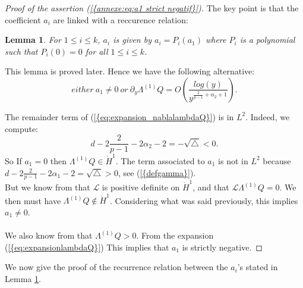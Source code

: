 \documentclass[11pt,a4paper,reqno]{amsart}
\newtheorem{lemma}[theorem]{Lemma}
\theoremstyle{remark}
\numberwithin{equation}{section}
\begin{document}
\begin{appendix}
\begin{proof}[Proof of the assertion {{\rm (\ref{{annexe:eq:a1 strict negatif}})}}]
The key point is that the coefficient $a_i$ are linked with a reccurence relation:

\begin{lemma}\label{lem:relationrecurrencecoefasymptotique}
For $1\leq i \leq k$, $a_i$ is given by $a_i=P_i(a_1)$ where $P_i$ is a polynomial such that $P_i(0)=0$ for all $1\leq i \leq k$.
\end{lemma}

This lemma is proved later. Hence we have the following alternative:
\begin{equation}
either \ a_1 \neq 0 \ or \ \partial_y \Lambda^{(1)} Q= O\left( \frac{log(y)}{y^{\frac{2}{p-1}+\alpha_2+1}}\right) .
\end{equation}

The remainder term of {{\rm (\ref{{eq:expansion_nablalambdaQ}})}} is in $L^2$. Indeed, we compute:
$$
d-2\frac{2}{p-1}-2\alpha_2-2=-\sqrt{\triangle}<0 .
$$
So If $a_1=0$ then $\Lambda^{(1)}Q \in \dot{H}^1$. The term associated to $a_1$ is not in $L^2$ because $d-2\frac{2}{p-1}-2\alpha_1-2=\sqrt{\triangle}>0$, see {{\rm (\ref{{defgamma}})}}.
\\But we know from \cite{KaS} that $\mathcal{L}$ is positive definite on $\dot{H}^1$, and that $\mathcal{L}\Lambda^{(1)} Q=0$. We then must have $\Lambda^{(1)}Q \notin \dot{H}^1$. Considering what was said previously, this implies $a_1\neq 0$.\\
\\
We also know from \cite{KaS} that $\Lambda^{(1)}Q>0$. From the expansion {{\rm (\ref{{eq:expansionlambdaQ}})}} This implies that $a_1$ is strictly negative.
\end{proof}

We now give the proof of the recurrence relation between the $a_i$'s stated in Lemma \ref{lem:relationrecurrencecoefasymptotique}.


\end{appendix}
\end{document}
